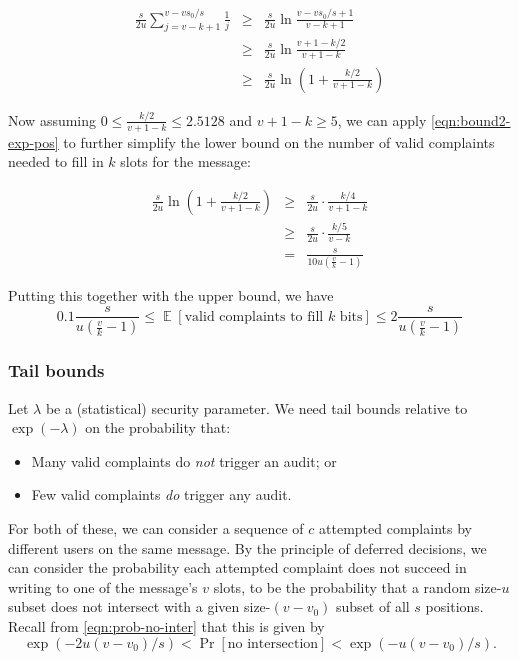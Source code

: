 \documentclass[letterpaper,12pt]{article}
\DeclareMathOperator{\EX}{\mathbb{E}}
\begin{document}
\begin{eqnarray*}
\frac{s}{2u}\sum_{j=v-k+1}^{v-vs_0/s} \frac{1}{j}
  &\ge& \frac{s}{2u}\ln\frac{v-vs_0/s+1}{v-k+1} \\
  &\ge& \frac{s}{2u}\ln\frac{v+1-k/2}{v+1-k} \\
  &\ge& \frac{s}{2u}\ln\left(1 + \frac{k/2}{v+1-k}\right)
\end{eqnarray*}

Now assuming \(0 \le \frac{k/2}{v+1-k} \le 2.5128\) and
\(v+1-k \ge 5\),
we can apply \eqref{eqn:bound2-exp-pos}
to further simplify the lower bound on the number of valid complaints
needed to fill in $k$ slots for the message:

\begin{eqnarray*}
\frac{s}{2u}\ln\left(1 + \frac{k/2}{v+1-k}\right)
  &\ge& \frac{s}{2u} \cdot \frac{k/4}{v+1-k} \\
  &\ge& \frac{s}{2u} \cdot \frac{k/5}{v-k} \\
  &=& \frac{s}{10u(\tfrac{v}{k}-1)}
\end{eqnarray*}

Putting this together with the upper bound, we have
\begin{equation}\label{eq:exp-fill}
  0.1 \frac{s}{u(\tfrac{v}{k}-1)}
  \le \EX[\text{valid complaints to fill $k$ bits}]
  \le 2 \frac{s}{u(\tfrac{v}{k}-1)}
\end{equation}

\subsubsection{Tail bounds}

Let $\lambda$ be a (statistical) security parameter. We need tail bounds
relative to $\exp(-\lambda)$ on the probability that:
\begin{itemize}
  \item Many valid complaints do \emph{not} trigger an audit; or
  \item Few valid complaints \emph{do} trigger any audit.
\end{itemize}

For both of these, we can consider a sequence of $c$ attempted
complaints by different users on the same message. By the principle of
deferred decisions, we can consider the probability each attempted complaint does
not succeed in writing to one of the message's $v$ slots, to be the
probability that a random size-$u$ subset
does not intersect with a given size-$(v-v_0)$ subset of all $s$ positions.
Recall from \eqref{eqn:prob-no-inter} that this is given by
\[
  \exp(-2u(v-v_0)/s) < \Pr[\text{no intersection}] < \exp(-u(v-v_0)/s).
\]
\end{document}
